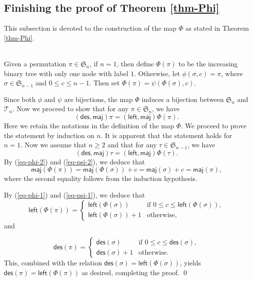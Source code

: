 \documentclass[12pt]{article}
\numberwithin{equation}{section}
\theoremstyle{plain}
\def\des{\mathsf{des}}
\def\maj{\mathsf{maj}}
\def\l{\mathsf{left}}
\def\l{\mathsf{left}}
\def\B{\mathcal{T}}
\begin{document}
	 			\subsection{Finishing the proof of Theorem \ref{thm-Phi}}
	 				This subsection is devoted to the construction of the map $\Phi$ as stated in Theorem \ref{thm-Phi}. 
	 				
	 				\\
	 				Given a permutation $\pi\in \mathfrak{S}_n$,  if $n=1$, then define $\Phi(\pi)$ to be the increasing binary tree with only one node with label $1$. Otherwise, let $\phi(\sigma, c)=\pi$, where $\sigma\in\mathfrak{S}_{n-1}$ and $0\leq c\leq n-1$. Then set
	 				$\Phi(\pi)=\psi(\Phi(\sigma), c)$. 
	 				
	 				
	 				 Since both $\phi$ and $\psi$ are bijections, the map $\Phi$  induces a bijection between $\mathfrak{S}_n$ and $\B_n$. 
	 				Now we proceed to show that for any $\pi\in \mathfrak{S}_n$, we have
	 				$$
	 				(\des, \maj)\pi=(\l, \maj)\Phi(\pi). 
	 				$$
	 				Here we retain the notations in the definition of the map $\Phi$.  We proceed to prove the statement by induction on $n$. It is apparent that the statement holds for $n=1$. 
	 				Now we assume that $n\geq 2$ and that for any $\tau\in \mathfrak{S}_{n-1}$, we have  $$
	 				(\des, \maj)\tau=(\l, \maj)\Phi(\tau). 
	 				$$
	 				 By (\ref{eq-phi-2})  and (\ref{eq-psi-2}), we deduce that
	 				 $$
	 				 \maj(\Phi(\pi))=\maj(\Phi(\sigma))+c=\maj(\sigma)+c=\maj(\pi),
	 				 $$
	 				where the  second equality follows from the induction hypothesis.
	 				
	 				By  (\ref{eq-phi-1})  and (\ref{eq-psi-1}), we deduce that
	 				$$
	 					\l(\Phi(\pi))=\left\{ 
	 				\begin{array}{ll}
	 					\l(\Phi(\sigma)) & \text{if } 0\le c\le \l(\Phi(\sigma)),\\[2pt]
	 					\l(\Phi(\sigma))+1 & \text{otherwise},
	 				\end{array}
	 				\right. 
	 				$$
	 				and 
	 				
	 				$$
	 				\des(\pi)=\left\{ 
	 				\begin{array}{ll}
	 					\des(\sigma)& \text{if } 0\le c\le \des(\sigma),\\[2pt]
	 					\des(\sigma)+1 & \text{otherwise}.
	 				\end{array}
	 				\right. 
	 				$$
	 	This,  combined with the relation $\des(\sigma)=\l(\Phi(\sigma))$,  yields $\des(\pi)=\l(\Phi(\pi))$ as desired, completing the proof. \qed
	 				
\end{document}
